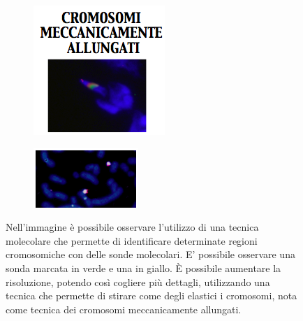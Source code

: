 \documentclass[11pt]{book}
\begin{document}
\begin{figure}[h!]
\centering
\begin{subfigure}{.5\textwidth}
  \centering
  \includegraphics[width=.7\linewidth]{img/10_cromoallungati.png}
  \caption{}
  \label{fig:sub1}
\end{subfigure}%
\begin{subfigure}{.5\textwidth}
  \centering
  \includegraphics[width=1.1\linewidth]{img/11_cromoallungati.png}
  \caption{}
  \label{fig:sub2}
\end{subfigure}
\caption{Nell’immagine è possibile osservare l’utilizzo di una tecnica molecolare che permette di identificare determinate regioni cromosomiche con delle sonde molecolari. E’ possibile osservare una sonda marcata in verde e una in giallo. 
È possibile aumentare la risoluzione, potendo così cogliere più dettagli, utilizzando una tecnica che permette di stirare come degli elastici i cromosomi, nota come tecnica dei cromosomi meccanicamente allungati. }
\label{fig:test}
\end{figure}
\end{document}

